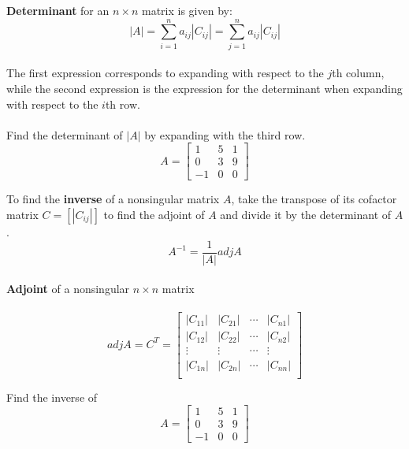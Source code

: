 \documentclass{./../../latex/handout}
\begin{document}
\newpage
\textbf{Determinant} for an  $n \times n$ matrix is given by:
 \[|A| = \sum_{i=1}^n a_{ij} |C_{ij}| = \sum_{j=1}^n a_{ij} |C_{ij}| \] \\
The first expression corresponds to expanding with respect to the $j$th column, while the second expression is the expression for the determinant when expanding with respect to the $i$th row. \\~\\

Find the determinant of $|A|$ by expanding with the third row.
\[
A=\left[\begin{array}{ccc}
1 & 5 & 1 \\
0 & 3 & 9 \\
-1 & 0 & 0
\end{array}\right]
\]

\newpage 

To find the \textbf{inverse} of a nonsingular matrix $A$, take the transpose of its cofactor matrix $C = [|C_{ij}|]$ to find the adjoint of $A$ and divide it by the determinant of $A$. 
\[ A^{-1} = \frac{1}{|A|} adj A\] \\

 \textbf{Adjoint} of a nonsingular $n \times n$ matrix \\~\\
 \[adj A = C^T = \left[\begin{array}{llll}
|C_{11}| & |C_{21}| & \cdots & |C_{n1}| \\
|C_{12}| & |C_{22}| & \cdots &  |C_{n2}| \\
\vdots &\vdots & \cdots &  \vdots \\
|C_{1n}| & |C_{2n}| & \cdots & |C_{nn}| \\
\end{array}\right]\]
\vspace{1em}

Find the inverse of \[
A=\left[\begin{array}{ccc}
1 & 5 & 1 \\
0 & 3 & 9 \\
-1 & 0 & 0
\end{array}\right]
\]
\end{document}
